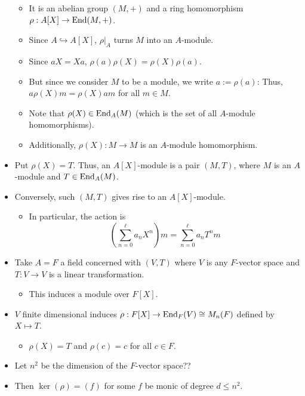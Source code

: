 \documentclass[../notes.tex]{subfiles}
\begin{document}
\begin{itemize}
    \begin{itemize}
        \item It is an abelian group $(M,+)$ and a ring homomorphism $\rho:A[X]\to\operatorname{End}(M,+)$.
        \item Since $A\hookrightarrow A[X]$, $\rho|_A$ turns $M$ into an $A$-module.
        \item Since $aX=Xa$, $\rho(a)\rho(X)=\rho(X)\rho(a)$.
        \item But since we consider $M$ to be a module, we write $a:=\rho(a)$: Thus, $a\rho(X)m=\rho(X)am$ for all $m\in M$.
        \item Note that $\rho(X)\in\operatorname{End}_A(M)$ (which is the set of all $A$-module homomorphisms).
        \item Additionally, $\rho(X):M\to M$ is an $A$-module homomorphism.
    \end{itemize}
    \item Put $\rho(X)=T$. Thus, an $A[X]$-module is a pair $(M,T)$, where $M$ is an $A$-module and $T\in\operatorname{End}_A(M)$.
    \item Conversely, such $(M,T)$ gives rise to an $A[X]$-module.
    \begin{itemize}
        \item In particular, the action is
        \begin{equation*}
            \left( \sum_{n=0}^\ell a_nX^n \right)m = \sum_{n=0}^\ell a_nT^nm
        \end{equation*}
    \end{itemize}
    \item Take $A=F$ a field concerned with $(V,T)$ where $V$ is any $F$-vector space and $T:V\to V$ is a linear transformation.
    \begin{itemize}
        \item This induces a module over $F[X]$.
    \end{itemize}
    \item $V$ finite dimensional induces $\rho:F[X]\to\operatorname{End}_F(V)\cong M_n(F)$ defined by $X\mapsto T$.
    \begin{itemize}
        \item $\rho(X)=T$ and $\rho(c)=c$ for all $c\in F$.
    \end{itemize}
    \item Let $n^2$ be the dimension of the $F$-vector space??
    \item Then $\ker(\rho)=(f)$ for some $f$ be monic of degree $d\leq n^2$.
    \begin{figure}[H]
        \centering
\end{figure}
\end{itemize}
\end{document}
